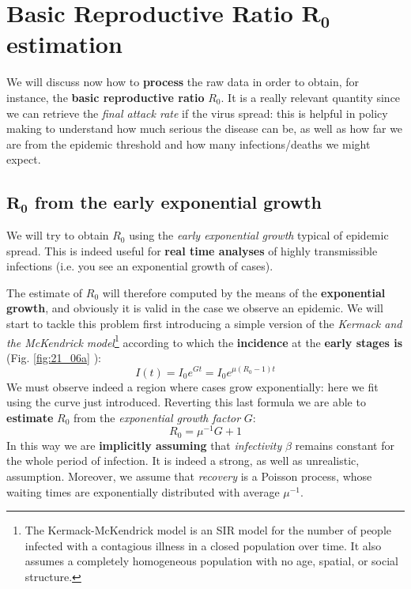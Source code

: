 \documentclass[../main/main.tex]{subfiles}
\begin{document}
\section{Basic Reproductive Ratio $\pmb{R_0}$ estimation}

We will discuss now how to \textbf{process} the raw data in order to obtain, for instance, the \textbf{basic reproductive ratio} $R_0$. It is a really relevant quantity since we can retrieve the \textit{final attack rate} if the virus spread: this is helpful in policy making to understand how much serious the disease can be, as well as how far we are from the epidemic threshold and how many infections/deaths we might expect. 

\subsection{$\pmb{R_0}$ from the early exponential growth}

We will try to obtain $R_0$ using the \textit{early exponential growth} typical of epidemic spread. This is indeed useful for \textbf{real time analyses} of highly transmissible infections (i.e. you see an exponential growth of cases).

The estimate of $R_0$ will therefore computed by the means of the \textbf{exponential growth}, and obviously it is valid in the case we observe an epidemic. We will start to tackle this problem first introducing a simple version of the \textit{Kermack and the McKendrick model}\footnote{The Kermack-McKendrick model is an SIR model for the number of people infected with a contagious illness in a closed population over time. It also assumes a completely homogeneous population with no age, spatial, or social structure.} according to which the \textbf{incidence} at the \textbf{early stages is} (Fig. \ref{fig:21_06a} ):
\begin{equation}
    I(t) = I_0 e^{Gt} = I_0 e^{\mu(R_0-1)t}
\end{equation}
We must observe indeed a region where cases grow exponentially: here we fit using the curve just introduced. Reverting this last formula we are able to \textbf{estimate} $R_0$ from the \textit{exponential growth factor} $G$:
\begin{equation}
    R_0 = \mu^{-1} G + 1
\end{equation}
In this way we are \textbf{implicitly assuming} that \textit{infectivity} $\beta$ remains constant for the whole period of infection. It is indeed a strong, as well as unrealistic, assumption. Moreover, we assume that \textit{recovery} is a Poisson process, whose waiting times are exponentially distributed with average $\mu^{-1}$.
\end{document}
